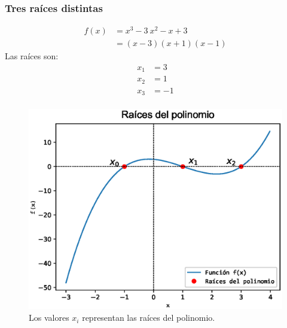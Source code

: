 \begin{frame}[fragile]
\captionsetup{justification=centering}
\frametitle{Tres raíces distintas}
\begin{minipage}{5cm}
\fontsize{12}{12}\selectfont
\begin{align*}
f(x) & = x^{3} - 3 \: x^{2} - x + 3 \\
&= (x - 3)(x + 1)(x - 1)
\end{align*}
Las raíces son:
\begin{align*}
x_{1} &= 3 \\
x_{2} &= 1 \\
x_{3} &= -1 \\
\end{align*}
\end{minipage}
\hspace{0.5cm}
\begin{minipage}{4.5cm}
\begin{figure}
	\centering
	\includegraphics[scale=0.3]{Imagenes/raices_polinomio_2020_01.eps}
	\caption{Los valores $x_{i}$ representan las raíces del polinomio.}
\end{figure}
\end{minipage}
\end{frame}
